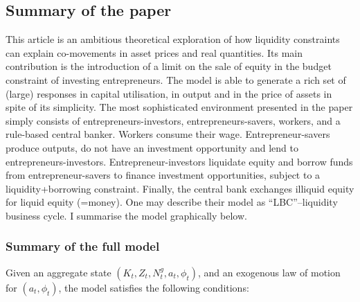 \documentclass{amsart}
\theoremstyle{definition}
\theoremstyle{remark}
\numberwithin{equation}{section}
\begin{document}
\subsection*{Summary of the paper} This article is an ambitious theoretical exploration of how liquidity constraints can explain co-movements in asset prices and real quantities. Its main contribution is the introduction of a limit on the sale of equity in the budget constraint of investing entrepreneurs. The model is able to generate a rich set of (large) responses in capital utilisation, in output and in the price of assets in spite of its simplicity. The most sophisticated environment presented in the paper simply consists of entrepreneurs-investors, entrepreneurs-savers, workers, and a rule-based central banker. Workers consume their wage. Entrepreneur-savers produce outputs, do not have an investment opportunity and lend to entrepreneurs-investors. Entrepreneur-investors liquidate equity and borrow funds from entrepreneur-savers to finance investment opportunities, subject to a liquidity+borrowing constraint. Finally, the central bank exchanges illiquid equity for liquid equity (=money). One may describe their model as ``LBC''--liquidity business cycle. I summarise the model graphically below.

\subsubsection*{Summary of the full model} Given an aggregate state $\left(K_{t}, Z_{t}, N_{t}^{g}, a_{t}, \phi_{t}\right)$, and an exogenous law of motion for $\left(a_{t}, \phi_{t}\right)$, the model satisfies the following conditions:
\end{document}
